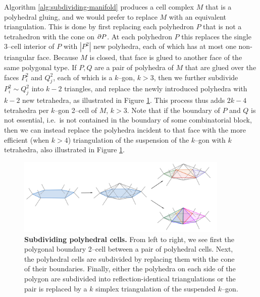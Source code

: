 
Algorithm \ref{alg:subdividing-manifold} produces a cell complex $M$ that is a polyhedral gluing, and we would prefer to replace $M$ with an equivalent triangulation.
This is done by first replacing each polyhedron $P$ that is not a tetrahedron with the cone on $\partial P$.
At each polyhedron $P$ this replaces the single 3--cell interior of $P$ with $|P^2|$ new polyhedra, each of which has at most one non-triangular face.
Because $M$ is closed, that face is glued to another face of the same polygonal type.
If $P,Q$ are a pair of polyhedra of $M$ that are glued over the faces $P_i^2$ and $Q_j^2$, each of which is a $k$--gon, $k>3$, then we further subdivide $P_i^2\sim Q_j^2$ into $k-2$ triangles, and replace the newly introduced polyhedra with $k-2$ new tetrahedra, as illustrated in Figure \ref{fig:subdivide-polyhedra}.
This process thus adds $2k-4$ tetrahedra per $k$--gon 2--cell of $M$, $k>3$.
Note that if the boundary of $P$ and $Q$ is not essential, i.e.\ is not contained in the boundary of some combinatorial block, then we can instead replace the polyhedra incident to that face with the more efficient (when $k>4$) triangulation of the suspension of the $k$--gon with $k$ tetrahedra, also illustrated in Figure \ref{fig:subdivide-polyhedra}.

\begin{figure}[h!]
	\centering
	\includegraphics[width=0.9\textwidth]{figures/subdivide-polyhedra.png}
	\caption{
		\textbf{Subdividing polyhedral cells.}
		From left to right, we see first the polygonal boundary 2--cell between a pair of polyhedral cells.
		Next, the polyhedral cells are subdivided by replacing them with the cone of their boundaries.
		Finally, either the polyhedra on each side of the polygon are subdivided into reflection-identical triangulations or the pair is replaced by a $k$ simplex triangulation  of the suspended $k$--gon.
	}
	\label{fig:subdivide-polyhedra}
\end{figure}


